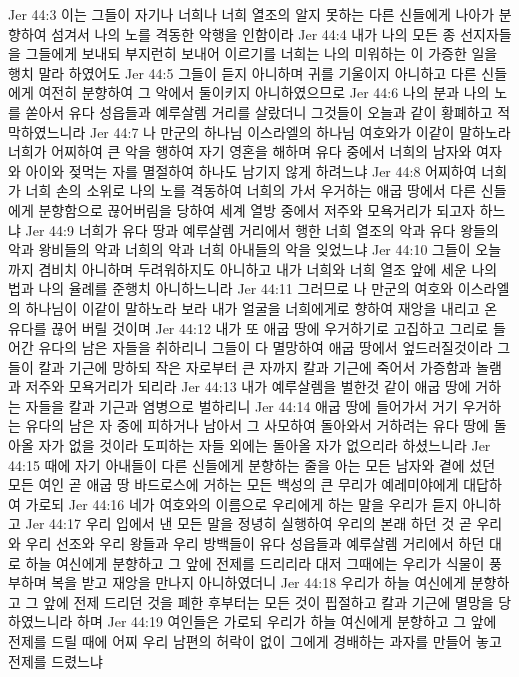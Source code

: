 Jer 44:3  이는 그들이 자기나 너희나 너희 열조의 알지 못하는 다른 신들에게 나아가 분향하여 섬겨서 나의 노를 격동한 악행을 인함이라
Jer 44:4  내가 나의 모든 종 선지자들을 그들에게 보내되 부지런히 보내어 이르기를 너희는 나의 미워하는 이 가증한 일을 행치 말라 하였어도
Jer 44:5  그들이 듣지 아니하며 귀를 기울이지 아니하고 다른 신들에게 여전히 분향하여 그 악에서 둘이키지 아니하였으므로
Jer 44:6  나의 분과 나의 노를 쏟아서 유다 성읍들과 예루살렘 거리를 살랐더니 그것들이 오늘과 같이 황폐하고 적막하였느니라
Jer 44:7  나 만군의 하나님 이스라엘의 하나님 여호와가 이같이 말하노라 너희가 어찌하여 큰 악을 행하여 자기 영혼을 해하며 유다 중에서 너희의 남자와 여자와 아이와 젖먹는 자를 멸절하여 하나도 남기지 않게 하려느냐
Jer 44:8  어찌하여 너희가 너희 손의 소위로 나의 노를 격동하여 너희의 가서 우거하는 애굽 땅에서 다른 신들에게 분향함으로 끊어버림을 당하여 세계 열방 중에서 저주와 모욕거리가 되고자 하느냐
Jer 44:9  너희가 유다 땅과 예루살렘 거리에서 행한 너희 열조의 악과 유다 왕들의 악과 왕비들의 악과 너희의 악과 너희 아내들의 악을 잊었느냐
Jer 44:10  그들이 오늘까지 겸비치 아니하며 두려워하지도 아니하고 내가 너희와 너희 열조 앞에 세운 나의 법과 나의 율례를 준행치 아니하느니라
Jer 44:11  그러므로 나 만군의 여호와 이스라엘의 하나님이 이같이 말하노라 보라 내가 얼굴을 너희에게로 향하여 재앙을 내리고 온 유다를 끊어 버릴 것이며
Jer 44:12  내가 또 애굽 땅에 우거하기로 고집하고 그리로 들어간 유다의 남은 자들을 취하리니 그들이 다 멸망하여 애굽 땅에서 엎드러질것이라 그들이 칼과 기근에 망하되 작은 자로부터 큰 자까지 칼과 기근에 죽어서 가증함과 놀램과 저주와 모욕거리가 되리라
Jer 44:13  내가 예루살렘을 벌한것 같이 애굽 땅에 거하는 자들을 칼과 기근과 염병으로 벌하리니
Jer 44:14  애굽 땅에 들어가서 거기 우거하는 유다의 남은 자 중에 피하거나 남아서 그 사모하여 돌아와서 거하려는 유다 땅에 돌아올 자가 없을 것이라 도피하는 자들 외에는 돌아올 자가 없으리라 하셨느니라
Jer 44:15  때에 자기 아내들이 다른 신들에게 분향하는 줄을 아는 모든 남자와 곁에 섰던 모든 여인 곧 애굽 땅 바드로스에 거하는 모든 백성의 큰 무리가 예레미야에게 대답하여 가로되
Jer 44:16  네가 여호와의 이름으로 우리에게 하는 말을 우리가 듣지 아니하고
Jer 44:17  우리 입에서 낸 모든 말을 정녕히 실행하여 우리의 본래 하던 것 곧 우리와 우리 선조와 우리 왕들과 우리 방백들이 유다 성읍들과 예루살렘 거리에서 하던 대로 하늘 여신에게 분향하고 그 앞에 전제를 드리리라 대저 그때에는 우리가 식물이 풍부하며 복을 받고 재앙을 만나지 아니하였더니
Jer 44:18  우리가 하늘 여신에게 분향하고 그 앞에 전제 드리던 것을 폐한 후부터는 모든 것이 핍절하고 칼과 기근에 멸망을 당하였느니라 하며
Jer 44:19  여인들은 가로되 우리가 하늘 여신에게 분향하고 그 앞에 전제를 드릴 때에 어찌 우리 남편의 허락이 없이 그에게 경배하는 과자를 만들어 놓고 전제를 드렸느냐

